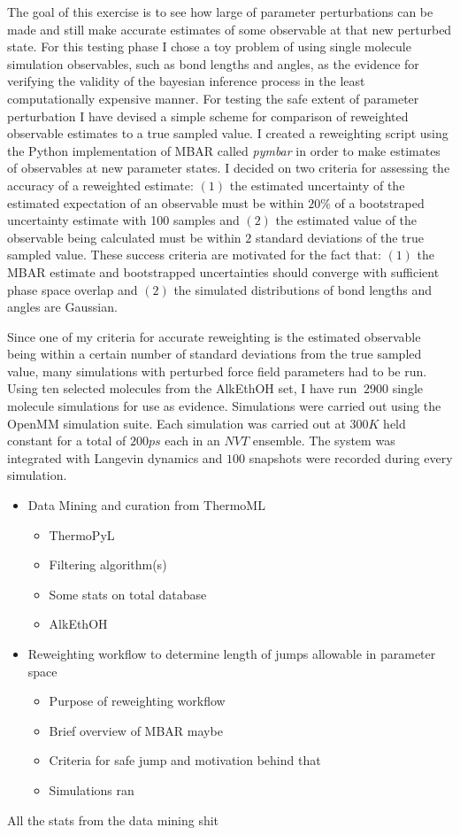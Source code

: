 \documentclass[rmp,nofootinbib,superscriptaddress,12pt,tightenlines,notitlepage]{revtex4-1}
\begin{document}
The goal of this exercise is to see how large of parameter perturbations can be made and still make accurate estimates of some observable at that new perturbed state. For this testing phase I chose a toy problem of using single molecule simulation observables, such as bond lengths and angles, as the evidence for verifying the validity of the bayesian inference process in the least computationally expensive manner. For testing the safe extent of parameter perturbation I have devised a simple scheme for comparison of reweighted observable estimates to a true sampled value. I created a reweighting script using the Python implementation
of MBAR called \textit{pymbar} in order to make estimates of observables at new parameter states. I decided on two criteria for assessing the accuracy
of a reweighted estimate: $\left(1\right)$ the estimated uncertainty of the estimated expectation of an observable must be within $20 \%$ of a bootstraped uncertainty estimate with 100 samples and $\left(2\right)$ the estimated value of the observable being calculated must be within $2$ standard deviations of the true
sampled value. These success criteria are motivated for the fact that: $\left(1\right)$ the MBAR estimate and bootstrapped uncertainties should converge with 
sufficient phase space overlap and $\left(2\right)$ the simulated distributions of bond lengths and angles are Gaussian. 


Since one of my criteria for accurate reweighting is the estimated observable being within a certain number of standard deviations from the true sampled value, many simulations with perturbed force field parameters had to be run. Using ten selected molecules from the AlkEthOH set, I have run $~2900$
single molecule simulations for use as evidence. Simulations were carried out using the OpenMM simulation suite. Each simulation was carried out at 
$300 K$ held constant for a total of $200 ps$ each in an $NVT$ ensemble. The system was integrated with Langevin dynamics and $100$ snapshots were recorded 
during every simulation.


\begin{itemize}
 \item Data Mining and curation from ThermoML
  \begin{itemize}
   \item ThermoPyL
   \item Filtering algorithm(s)
   \item Some stats on total database
   \item AlkEthOH
  \end{itemize}
 \item Reweighting workflow to determine length of jumps allowable in parameter space
  \begin{itemize}
   \item Purpose of reweighting workflow
   \item Brief overview of MBAR maybe
   \item Criteria for safe jump and motivation behind that
   \item Simulations ran
  \end{itemize}
\end{itemize}  
All the stats from the data mining shit
\end{document}
